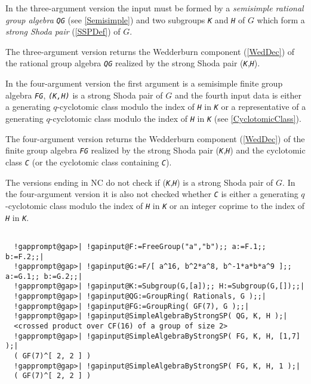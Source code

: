 \documentclass[a4paper,11pt]{report}
\begin{document}
{{{ In the three-argument version the input must be formed by a \emph{semisimple rational group algebra} \mbox{\texttt{\mdseries\slshape QG}} (see \ref{Semisimple}) and two subgroups \mbox{\texttt{\mdseries\slshape K}} and \mbox{\texttt{\mdseries\slshape H}} of $G$ which form a \emph{strong Shoda pair} (\ref{SSPDef}) of $G$. 

 The three-argument version returns the Wedderburn component (\ref{WedDec}) of the rational group algebra \mbox{\texttt{\mdseries\slshape QG}} realized by the strong Shoda pair (\mbox{\texttt{\mdseries\slshape K}},\mbox{\texttt{\mdseries\slshape H}}). 

 In the four-argument version the first argument is a semisimple finite group
algebra \mbox{\texttt{\mdseries\slshape FG}}, \mbox{\texttt{\mdseries\slshape (K,H)}} is a strong Shoda pair of $G$ and the fourth input data is either a generating $q$-cyclotomic class modulo the index of \mbox{\texttt{\mdseries\slshape H}} in \mbox{\texttt{\mdseries\slshape K}} or a representative of a generating $q$-cyclotomic class modulo the index of \mbox{\texttt{\mdseries\slshape H}} in \mbox{\texttt{\mdseries\slshape K}} (see \ref{CyclotomicClass}). 

 The four-argument version returns the Wedderburn component (\ref{WedDec}) of the finite group algebra \mbox{\texttt{\mdseries\slshape FG}} realized by the strong Shoda pair (\mbox{\texttt{\mdseries\slshape K}},\mbox{\texttt{\mdseries\slshape H}}) and the cyclotomic class \mbox{\texttt{\mdseries\slshape C}} (or the cyclotomic class containing \mbox{\texttt{\mdseries\slshape C}}). 

 The versions ending in NC do not check if (\mbox{\texttt{\mdseries\slshape K}},\mbox{\texttt{\mdseries\slshape H}}) is a strong Shoda pair of $G$. In the four-argument version it is also not checked whether \mbox{\texttt{\mdseries\slshape C}} is either a generating $q$-cyclotomic class modulo the index of \mbox{\texttt{\mdseries\slshape H}} in \mbox{\texttt{\mdseries\slshape K}} or an integer coprime to the index of \mbox{\texttt{\mdseries\slshape H}} in \mbox{\texttt{\mdseries\slshape K}}. 
\begin{Verbatim}[commandchars=!@|,fontsize=\small,frame=single,label=Example]
  
  !gapprompt@gap>| !gapinput@F:=FreeGroup("a","b");; a:=F.1;; b:=F.2;;|
  !gapprompt@gap>| !gapinput@G:=F/[ a^16, b^2*a^8, b^-1*a*b*a^9 ];; a:=G.1;; b:=G.2;;|
  !gapprompt@gap>| !gapinput@K:=Subgroup(G,[a]);; H:=Subgroup(G,[]);;|
  !gapprompt@gap>| !gapinput@QG:=GroupRing( Rationals, G );;|
  !gapprompt@gap>| !gapinput@FG:=GroupRing( GF(7), G );;|
  !gapprompt@gap>| !gapinput@SimpleAlgebraByStrongSP( QG, K, H );|
  <crossed product over CF(16) of a group of size 2>
  !gapprompt@gap>| !gapinput@SimpleAlgebraByStrongSP( FG, K, H, [1,7] );|
  ( GF(7)^[ 2, 2 ] )
  !gapprompt@gap>| !gapinput@SimpleAlgebraByStrongSP( FG, K, H, 1 );|
  ( GF(7)^[ 2, 2 ] )
  

\end{Verbatim}}}}
\end{document}

